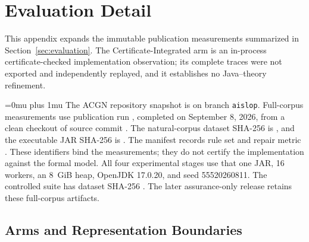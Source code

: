 \section{Evaluation Detail}
\label{app:evaluation-detail}

This appendix expands the immutable publication measurements summarized in
Section~\ref{sec:evaluation}.  The Certificate-Integrated arm is an in-process
certificate-checked implementation observation; its complete traces were not
exported and independently replayed, and it establishes no Java--theory refinement.

\begingroup
\def\UrlBreaks{\do0\do1\do2\do3\do4\do5\do6\do7\do8\do9%
  \do\a\do\b\do\c\do\d\do\e\do\f}
\Urlmuskip=0mu plus 1mu\relax
The ACGN repository snapshot is
 on branch
\texttt{aislop}. Full-corpus measurements use publication run
, completed on September 8,
2026, from a clean checkout of source commit
.
The natural-corpus dataset SHA-256 is
,
and the executable JAR SHA-256 is
.
The manifest records rule set
 and repair metric
.  These identifiers bind the
measurements; they do not certify the implementation against the formal model.
All four experimental stages use that one JAR, 16 workers, an 8~GiB heap,
OpenJDK 17.0.20, and seed 55520260811. The controlled suite has dataset
SHA-256 .
The later assurance-only release retains these full-corpus artifacts.
\endgroup

\subsection{Arms and Representation Boundaries}


